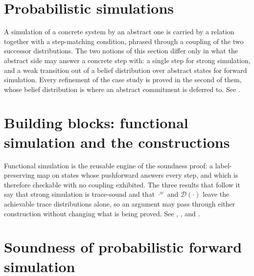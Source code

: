 





\section{Probabilistic simulations}

A simulation of a concrete system by an abstract one is carried by a relation together with a step-matching condition, phrased through a coupling of the two successor distributions.
The two notions of this section differ only in what the abstract side may answer a concrete step with: a single step for strong simulation, and a weak transition out of a belief distribution over abstract states for forward simulation.
Every refinement of the case study is proved in the second of them, whose belief distribution is where an abstract commitment is deferred to.
See .





\section{Building blocks: functional simulation and the constructions}

Functional simulation is the reusable engine of the soundness proof: a label-preserving map on states whose pushforward answers every step, and which is therefore checkable with no coupling exhibited.
The three results that follow it say that strong simulation is trace-sound and that $\cdot^w$ and $\mathcal{D}(\cdot)$ leave the achievable trace distributions alone, so an argument may pass through either construction without changing what is being proved.
See , ,  and .






\section{Soundness of probabilistic forward simulation}
\label{sec:soundness}


